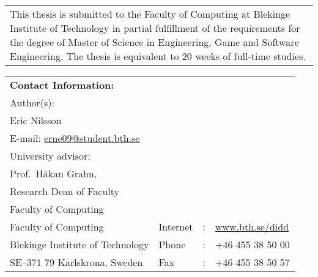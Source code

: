 
{\pagestyle{empty}
\changepage{5cm}{1cm}{-0.5cm}{-0.5cm}{}{-2cm}{}{}{}
\noindent%
\begin{tabular}{p{\textwidth}}
{\small This thesis is submitted to the Faculty of Computing at Blekinge
Institute of Technology in partial fulfillment of the requirements for the degree of Master of Science in Engineering, Game and Software Engineering. The thesis is equivalent to $20$ weeks of
full-time studies.} %
\end{tabular}

\par\vspace {17cm}

\noindent%
\begin{tabular}{p{}lcl}
\textbf{Contact Information:}\\
Author(s):\\
Eric Nilsson\\
E-mail: \href{mailto:erne09@student.bth.se}{erne09@student.bth.se} \\ %
\par\vspace {0.5cm}
University advisor:\\
Prof.\ Håkan Grahn,\\
Research Dean of Faculty\\
Faculty of Computing

\par\vspace {0.5cm}

\noindent%
 \\
Faculty of Computing & Internet & : & \href{http://www.bth.se/didd}{www.bth.se/didd}\\
Blekinge Institute of Technology & Phone	& : & +46 455 38 50 00 \\
SE--371 79 Karlskrona, Sweden & Fax & : & +46 455 38 50 57 \\
\end{tabular}
\clearpage
} %

\setcounter{page}{1}
